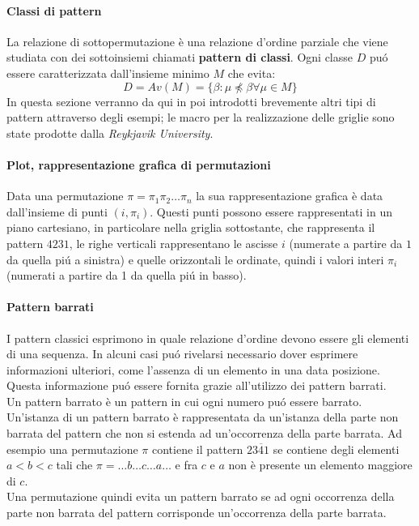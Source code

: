 \paragraph*{Classi di pattern} La relazione {di sottopermutazione} \`e una relazione d'ordine parziale {che viene studiata con dei sottoinsiemi chiamati \textbf{pattern di classi}}. Ogni classe $D$ pu\'o essere caratterizzata dall'insieme {minimo} $M$ che evita:$$ D = Av(M) = \{\beta:\mu\not\preceq\beta\forall\mu\in M\}$$
In questa sezione verranno da qui in poi introdotti brevemente altri tipi di pattern\cite{branden2011mesh} attraverso degli esempi; le macro per la realizzazione delle griglie sono state prodotte dalla \textit{Reykjavik University}\cite{patternmacros}.
\paragraph{Plot, rappresentazione grafica di permutazioni} Data una permutazione $\pi = \pi_1\pi_2\dots\pi_n$ la sua rappresentazione grafica \`e data dall'insieme di punti $(i,\pi_i)$. Questi punti possono essere rappresentati in un piano cartesiano, in particolare nella griglia sottostante, che rappresenta il pattern $4231$, le righe verticali rappresentano le ascisse $i$ (numerate a partire da $1$ da quella pi\'u a sinistra) e quelle orizzontali le ordinate, quindi i valori interi $\pi_i$ (numerati a partire da 1 da quella pi\'u in basso).
\begin{center}\end{center}
\paragraph{Pattern barrati} I pattern classici esprimono in quale relazione d'ordine devono essere gli elementi di una sequenza. In alcuni casi pu\'o rivelarsi necessario dover esprimere informazioni ulteriori, come l'assenza di un elemento in una data posizione. Questa informazione pu\'o essere fornita grazie all'utilizzo dei pattern barrati.\\
Un pattern barrato \`e un pattern in cui ogni numero pu\'o essere barrato.\\
Un'istanza di un pattern barrato \`e rappresentata da un'istanza della parte non barrata del pattern che non si estenda ad un'occorrenza della parte barrata. Ad esempio una permutazione $\pi$ contiene il pattern $23\overline{4}1$ se contiene degli elementi $a<b<c$ tali che $\pi=\dots b \dots c \dots a\dots$ e fra $c$ e $a$ non \`e presente un elemento maggiore di $c$.\\
Una permutazione quindi evita un pattern barrato se ad ogni occorrenza della parte non barrata del pattern corrisponde un'occorrenza della parte barrata.
